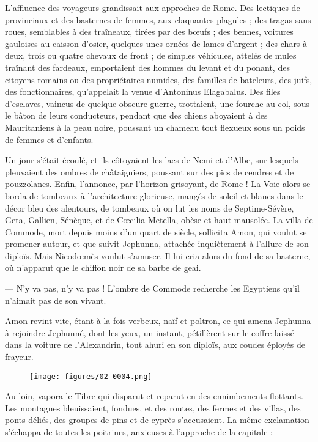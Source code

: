 \documentclass[a4paper, 11pt, oneside, polutonikogreek, french]{article}
\begin{document}
L'affluence des voyageurs grandissait aux approches de Rome. Des lectiques de provinciaux et des basternes de femmes, aux claquantes plagules ; des tragas sans roues, semblables à des traîneaux, tirées par des bœufs ; des bennes, voitures gauloises au caisson d'osier, quelques-unes ornées de lames d'argent ; des chars à deux, trois ou quatre chevaux de front ; de simples véhicules, attelés de mules traînant des fardeaux, emportaient des hommes du levant et du ponant, des citoyens romains ou des propriétaires numides, des familles de bateleurs, des juifs, des fonctionnaires, qu'appelait la venue d'Antoninus Elagabalus. Des files d'esclaves, vaincus de quelque obscure guerre, trottaient, une fourche au col, sous le bâton de leurs conducteurs, pendant que des chiens aboyaient à des Mauritaniens à la peau noire, poussant un chameau tout flexueux sous un poids de femmes et d'enfants.

Un jour s'était écoulé, et ils côtoyaient les lacs de Nemi et d'Albe, sur lesquels pleuvaient des ombres de châtaigniers, poussant sur des pics de cendres et de pouzzolanes. Enfin, l'annonce, par l'horizon grisoyant, de Rome ! La Voie alors se borda de tombeaux à l'architecture glorieuse, mangés de soleil et blancs dans le décor bleu des alentours, de tombeaux où on lut les noms de Septime-Sévère, Geta, Gallien, Sénèque, et de Cœcilia Metella, obèse et haut mausolée. La villa de Commode, mort depuis moins d'un quart de siècle, sollicita Amon, qui voulut se promener autour, et que suivit Jephunna, attachée inquiètement à l'allure de son diploïs. Mais Nicodœmès voulut s'amuser. Il lui cria alors du fond de sa basterne, où n'apparut que le chiffon noir de sa barbe de geai.

--- N'y va pas, n'y va pas ! L'ombre de Commode recherche les Egyptiens qu'il n'aimait pas de son vivant.

Amon revint vite, étant à la fois verbeux, naïf et poltron, ce qui amena Jephunna à rejoindre Jephunné, dont les yeux, un instant, pétillèrent sur le coffre laissé dans la voiture de l'Alexandrin, tout ahuri en son diploïs, aux coudes éployés de frayeur.
\begin{figure}[H]
\centering
\texttt{[image: figures/02-0004.png]}
\end{figure}
Au loin, vapora le Tibre qui disparut et reparut en des ennimbements flottants. Les montagnes bleuissaient, fondues, et des routes, des fermes et des villas, des ponts déliés, des groupes de pins et de cyprès s'accusaient. La même exclamation s'échappa de toutes les poitrines, anxieuses à l'approche de la capitale :
\end{document}
